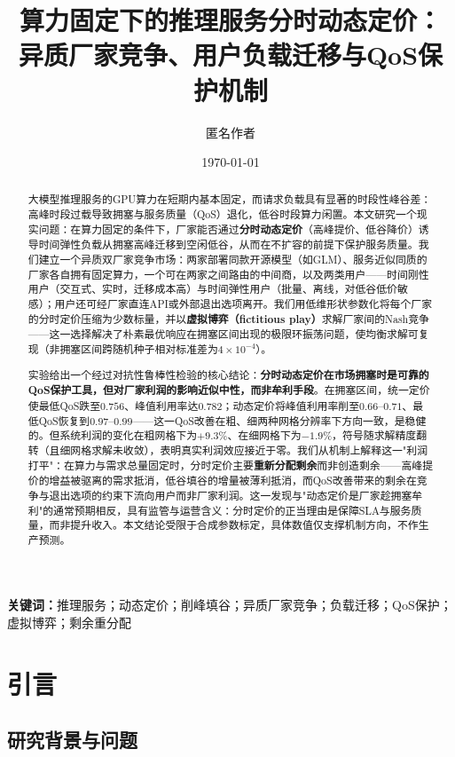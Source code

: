 \documentclass[UTF8,11pt]{ctexart}
\title{\textbf{算力固定下的推理服务分时动态定价：\\
异质厂家竞争、用户负载迁移与QoS保护机制}}
\author{匿名作者}
\date{\today}
\begin{document}
\maketitle

\begin{abstract}
大模型推理服务的GPU算力在短期内基本固定，而请求负载具有显著的时段性峰谷差：高峰时段过载导致拥塞与服务质量（QoS）退化，低谷时段算力闲置。本文研究一个现实问题：在算力固定的条件下，厂家能否通过\textbf{分时动态定价}（高峰提价、低谷降价）诱导时间弹性负载从拥塞高峰迁移到空闲低谷，从而在不扩容的前提下保护服务质量。我们建立一个异质双厂家竞争市场：两家部署同款开源模型（如GLM）、服务近似同质的厂家各自拥有固定算力，一个可在两家之间路由的中间商，以及两类用户——时间刚性用户（交互式、实时，迁移成本高）与时间弹性用户（批量、离线，对低谷低价敏感）；用户还可经厂家直连API或外部退出选项离开。我们用低维形状参数化将每个厂家的分时定价压缩为少数标量，并以\textbf{虚拟博弈（fictitious play）}求解厂家间的Nash竞争——这一选择解决了朴素最优响应在拥塞区间出现的极限环振荡问题，使均衡求解可复现（非拥塞区间跨随机种子相对标准差为$4\times10^{-4}$）。

实验给出一个经过对抗性鲁棒性检验的核心结论：\textbf{分时动态定价在市场拥塞时是可靠的QoS保护工具，但对厂家利润的影响近似中性，而非牟利手段}。在拥塞区间，统一定价使最低QoS跌至$0.756$、峰值利用率达$0.782$；动态定价将峰值利用率削至$0.66$--$0.71$、最低QoS恢复到$0.97$--$0.99$——这一QoS改善在粗、细两种网格分辨率下方向一致，是稳健的。但系统利润的变化在粗网格下为$+9.3\%$、在细网格下为$-1.9\%$，符号随求解精度翻转（且细网格求解未收敛），表明真实利润效应接近于零。我们从机制上解释这一"利润打平"：在算力与需求总量固定时，分时定价主要\textbf{重新分配剩余}而非创造剩余——高峰提价的增益被驱离的需求抵消，低谷填谷的增量被薄利抵消，而QoS改善带来的剩余在竞争与退出选项的约束下流向用户而非厂家利润。这一发现与"动态定价是厂家趁拥塞牟利"的通常预期相反，具有监管与运营含义：分时定价的正当理由是保障SLA与服务质量，而非提升收入。本文结论受限于合成参数标定，具体数值仅支撑机制方向，不作生产预测。
\end{abstract}

\noindent\textbf{关键词：}推理服务；动态定价；削峰填谷；异质厂家竞争；负载迁移；QoS保护；虚拟博弈；剩余重分配

\section{引言}

\subsection{研究背景与问题}
\end{document}

